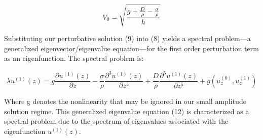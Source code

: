  
 \begin{equation} \label{eq1}
V_0 = \sqrt{\frac{ g + \frac{D}{\rho} - \frac{\sigma}{\rho} }{h} } 
   \\
\end{equation}
 
 
 
 
 
 Substituting our perturbative solution (9) into (8) yields a spectral problem—a generalized eigenvector/eigenvalue equation—for the first order perturbation term as an eigenfunction. The spectral problem is:
 
  \begin{equation} \label{eq1}
 \lambda u^{(1)}(z) =  g \frac{\partial u^{(1)}(z)}{\partial z}
      - \frac{\sigma}{\rho} \frac{\partial^3 u^{(1)}(z)}{\partial z^3}
      + \frac{D}{\rho} \frac{\partial^5 u^{(1)}(z)}{\partial z^5}  + g(u_z^{(0)},u_z^{(1)}) 
\end{equation}

Where g denotes the nonlinearity that may be ignored in our small amplitude solution regime. This generalized eigenvalue equation (12) is characterized as a spectral problem due to the spectrum of eigenvalues associated with the eigenfunction \(u^{(1)}(z)\). \\